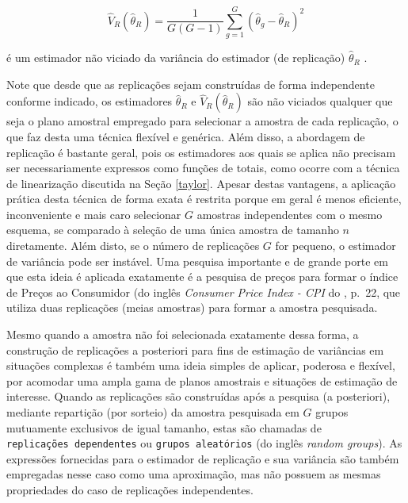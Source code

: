 \documentclass[]{book}
\theoremstyle{definition}
\theoremstyle{definition}
\theoremstyle{definition}
\theoremstyle{remark}
\begin{document}
\begin{equation}
\widehat{V}_{R}\left( \widehat{\theta }_{R}\right) =\frac{1}{G\left(
G-1\right) }\sum_{g=1}^{G}\left( \widehat{\theta }_{g}-\widehat{\theta }
_{R}\right) ^{2}  \label{eq:estpa24}
\end{equation}

é um estimador não viciado da variância do estimador (de replicação)
\(\widehat{\theta }_{R}\) .

Note que desde que as replicações sejam construídas de forma
independente conforme indicado, os estimadores \(\widehat{\theta }_{R}\)
e \(\widehat{V}_{R}\left( \widehat{\theta }_{R}\right)\) são não
viciados qualquer que seja o plano amostral empregado para selecionar a
amostra de cada replicação, o que faz desta uma técnica flexível e
genérica. Além disso, a abordagem de replicação é bastante geral, pois
os estimadores aos quais se aplica não precisam ser necessariamente
expressos como funções de totais, como ocorre com a técnica de
linearização discutida na Seção \ref{taylor}. Apesar destas vantagens, a
aplicação prática desta técnica de forma exata é restrita porque em
geral é menos eficiente, inconveniente e mais caro selecionar \(G\)
amostras independentes com o mesmo esquema, se comparado à seleção de
uma única amostra de tamanho \(n\) diretamente. Além disto, se o número
de replicações \(G\) for pequeno, o estimador de variância pode ser
instável. Uma pesquisa importante e de grande porte em que esta ideia é
aplicada exatamente é a pesquisa de preços para formar o índice de
Preços ao Consumidor (do inglês \emph{Consumer Price Index - CPI} do
\citep{USBureau}, p.~22, que utiliza duas replicações (meias amostras)
para formar a amostra pesquisada.

Mesmo quando a amostra não foi selecionada exatamente dessa forma, a
construção de replicações a posteriori para fins de estimação de
variâncias em situações complexas é também uma ideia simples de aplicar,
poderosa e flexível, por acomodar uma ampla gama de planos amostrais e
situações de estimação de interesse. Quando as replicações são
construídas após a pesquisa (a posteriori), mediante repartição (por
sorteio) da amostra pesquisada em \(G\) grupos mutuamente exclusivos de
igual tamanho, estas são chamadas de \texttt{replicações\ dependentes}
ou \texttt{grupos\ aleatórios} (do inglês \emph{random groups}). As
expressões fornecidas para o estimador de replicação e sua variância são
também empregadas nesse caso como uma aproximação, mas não possuem as
mesmas propriedades do caso de replicações independentes.
\end{document}
